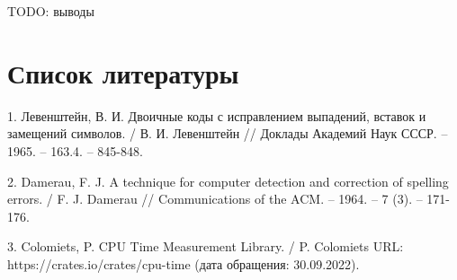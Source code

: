 \documentclass{report}
\begin{document}
TODO: выводы

\chapter*{Список литературы}

1. Левенштейн, В. И. Двоичные коды с исправлением выпадений,
вставок и замещений символов. / В. И. Левенштейн // Доклады
Академий Наук СССР. -- 1965. -- 163.4. -- 845-848.

2. Damerau, F. J. A technique for computer detection and correction
of spelling errors. / F. J. Damerau // Communications of the ACM.
-- 1964. -- 7 (3). -- 171-176.

3. Colomiets, P. CPU Time Measurement Library. / P. Colomiets
URL: https://crates.io/crates/cpu-time
(дата обращения: 30.09.2022).
\end{document}
